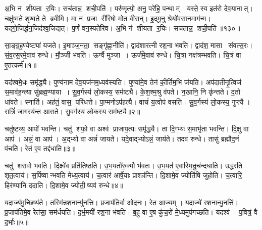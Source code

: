 अ॒भि न॑ शीयता र॒यिः।
सच॑तान्न॒ शची॒पति॑।
पर॑म्मृत्यो॒ अनु॒ परे॑हि॒ पन्थाम्।
यस्ते॒ स्व इत॑रो देव॒यानात्।
चक्षु॑ष्मते शृण्व॒ते ते ब्रवीमि।
मा न॑ प्र॒जा री॑रिषो॒ मोत वी॒रान्।
इ॒दमू॒नु श्रेयो॑व॒सान॒माग॑न्म।
यद्गो॒जिद्ध॑न॒जिद॑श्व॒जिद्यत्।
प॒र्णं वन॒स्पते॑रिव।
अ॒भि न॑ शीयता र॒यिः।
सच॑तान्न॒ शची॒पति॑॥१३०॥\anuvakamend[वन॒स्पता॑व॒द्भ्यो लो॒का द॑धिरे॒ तेज॑ इन्द्रि॒यन्धामा॑शीमहीवा॒भिन॑ शीयता र॒यिरेकं च]




\clearpage
{}
\setcounter{anuvakam}{0}

सा॒ङ्ग्र॒ह॒ण्येष्ट्या॑ यजते।
इ॒माञ्ज॒नता॒ सङ्गृ॑ह्णा॒नीति॑।
द्वाद॑शारत्नी रश॒ना भ॑वति।
द्वाद॑श॒ मासा संवत्स॒रः।
सं॒व॒त्स॒रमे॒वाव॑ रुन्धे।
मौ॒ञ्जी भ॑वति।
ऊर्ग्वै मुञ्जा।
ऊर्ज॑मे॒वाव॑ रुन्धे।
चि॒त्रा नक्ष॑त्रम्भवति।
चि॒त्रं वा ए॒तत्कर्म॑॥१॥

यद॑श्वमे॒धः समृ॑द्ध्यै।
पुण्य॑नाम देव॒यज॑नम॒ध्यव॑स्यति।
पुण्या॑मे॒व तेन॑ की॒र्तिम॒भि ज॑यति।
अप॑दातीनृ॒त्विज॑ स॒माव॑ह॒न्त्या सु॑ब्रह्म॒ण्याया।
सु॒व॒र्गस्य॑ लो॒कस्य॒ सम॑ष्ट्यै।
के॒श॒श्म॒श्रु व॑पते।
न॒खानि॒ नि कृ॑न्तते।
द॒तो धा॑वते।
स्नाति॑।
अह॑तं॒ वास॒ परि॑धत्ते।
पा॒प्मनोऽप॑हत्यै।
वाचं॑ य॒त्वोप॑ वसति।
सु॒व॒र्गस्य॑ लो॒कस्य॒ गुप्त्यै।
रात्रिं॑ जाग॒रय॑न्त आसते।
सु॒व॒र्गस्य॑ लो॒कस्य॒ सम॑ष्ट्यै॥२॥\anuvakamend[कर्म॑ धत्ते॒ पञ्च॑ च]

चतु॑ष्टय्य॒ आपो॑ भवन्ति।
चतु॑ शफो॒ वा अश्व॑ प्राजाप॒त्यः समृ॑द्ध्यै।
ता दि॒ग्भ्यः स॒माभृ॑ता भवन्ति।
दि॒क्षु वा आप॑।
अन्नं॒ वा आप॑।
अ॒द्भ्यो वा अन्नं॑ जायते।
यदे॒वाद्भ्योऽन्नं॒ जाय॑ते।
तदव॑ रुन्धे।
तासु॑ ब्रह्मौद॒नं प॑चति।
रेत॑ ए॒व तद्द॑धाति॥३॥

चतु॑ शरावो भवति।
दि॒क्ष्वे॑व प्रति॑तिष्ठति।
उ॒भ॒यतो॑रु॒क्मौ भ॑वतः।
उ॒भ॒यत॑ ए॒वास्मि॒न्रुच॑न्दधाति।
उद्ध॑रति शृत॒त्वाय॑।
स॒र्पिष्वान्भवति मेध्य॒त्वाय॑।
च॒त्वार॑ आर्\mbox{}षे॒याः प्राश्ञ॑न्ति।
दि॒शामे॒व ज्योति॑षि जुहोति।
च॒त्वारि॒ हिर॑ण्यानि ददाति।
दि॒शामे॒व ज्योती॒ष्यव॑ रुन्धे॥४॥

यदाज्य॑मु॒च्छिष्य॑ते।
तस्मि॑न्रश॒नान्यु॑नत्ति।
प्र॒जाप॑ति॒र्वा ओ॑द॒नः।
रेत॒ आज्यम्।
यदाज्ये॑ रश॒नान्यु॒नत्ति॑।
प्र॒जाप॑तिमे॒व रेत॑सा॒ सम॑र्धयति।
द॒र्भ॒मयी॑ रश॒ना भ॑वति।
ब॒हु वा ए॒ष कु॑च॒रो॑ मे॒ध्यमुप॑गच्छति।
यदश्व॑।
प॒वित्रं॒ वै द॒र्भाः॥५॥

